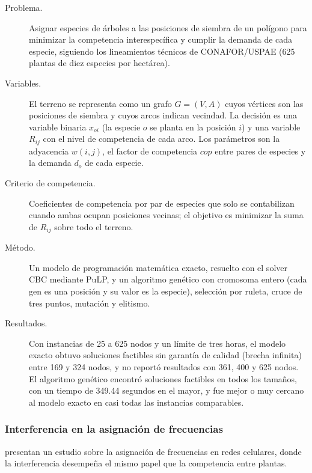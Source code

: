 \begin{description}
  \item[Problema.] Asignar especies de árboles a las posiciones de siembra de un polígono para minimizar la competencia interespecífica y cumplir la demanda de cada especie, siguiendo los lineamientos técnicos de CONAFOR/USPAE (625 plantas de diez especies por hectárea).
  \item[Variables.] El terreno se representa como un grafo $G=(V,A)$ cuyos vértices son las posiciones de siembra y cuyos arcos indican vecindad. La decisión es una variable binaria $x_{oi}$ (la especie $o$ se planta en la posición $i$) y una variable $R_{ij}$ con el nivel de competencia de cada arco. Los parámetros son la adyacencia $w(i,j)$, el factor de competencia $cop$ entre pares de especies y la demanda $d_o$ de cada especie.
  \item[Criterio de competencia.] Coeficientes de competencia por par de especies que solo se contabilizan cuando ambas ocupan posiciones vecinas; el objetivo es minimizar la suma de $R_{ij}$ sobre todo el terreno.
  \item[Método.] Un modelo de programación matemática exacto, resuelto con el solver CBC mediante PuLP, y un algoritmo genético con cromosoma entero (cada gen es una posición y su valor es la especie), selección por ruleta, cruce de tres puntos, mutación y elitismo.
  \item[Resultados.] Con instancias de 25 a 625 nodos y un límite de tres horas, el modelo exacto obtuvo soluciones factibles sin garantía de calidad (brecha infinita) entre 169 y 324 nodos, y no reportó resultados con 361, 400 y 625 nodos. El algoritmo genético encontró soluciones factibles en todos los tamaños, con un tiempo de 349.44 segundos en el mayor, y fue mejor o muy cercano al modelo exacto en casi todas las instancias comparables.
\end{description}

\subsubsection{Interferencia en la asignación de frecuencias}

\textcite{eisenblatter2002} presentan un estudio sobre la asignación de frecuencias en redes celulares, donde la interferencia desempeña el mismo papel que la competencia entre plantas.

